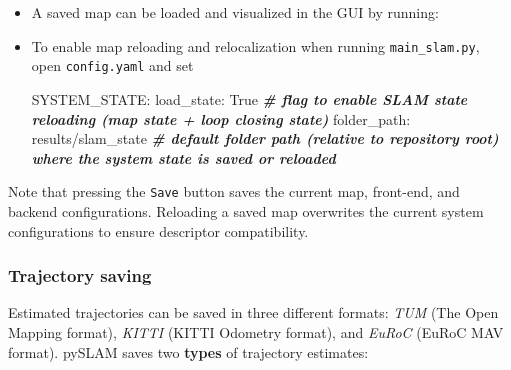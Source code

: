 \documentclass{article}
\newenvironment{Shaded}{\begin{snugshade}}{\end{snugshade}}
\newcommand{\BuiltInTok}[1]{\textcolor[rgb]{0.74,0.68,0.62}{#1}}
\newcommand{\CommentTok}[1]{\textcolor[rgb]{0.00,0.40,1.00}{\textbf{\textit{#1}}}}
\newcommand{\ExtensionTok}[1]{\textcolor[rgb]{0.74,0.68,0.62}{#1}}
\newcommand{\NormalTok}[1]{\textcolor[rgb]{0.74,0.68,0.62}{#1}}
\begin{document}
\begin{itemize}
\item
  A saved map can be loaded and visualized in the GUI by running: \\

\begin{scriptsize}
\begin{Shaded}
\end{Shaded}

\end{scriptsize}

\item
  To enable map reloading and relocalization when running
  \texttt{main\_slam.py}, open \texttt{config.yaml} and set \\

\begin{scriptsize}
\begin{Shaded}
\begin{Highlighting}[]
\ExtensionTok{SYSTEM_STATE}\NormalTok{:}
  \ExtensionTok{load_state}\NormalTok{: True                  }\CommentTok{# flag to enable SLAM state reloading (map state + loop closing state)}
  \ExtensionTok{folder_path}\NormalTok{: results/slam_state   }\CommentTok{# default folder path (relative to repository root) where the system state is saved or reloaded}
\end{Highlighting}
\end{Shaded}
\end{scriptsize}

\end{itemize}

Note that pressing the \texttt{Save} button saves the current map,
front-end, and backend configurations. Reloading a saved map overwrites
the current system configurations to ensure descriptor compatibility.

\hypertarget{trajectory-saving}{%
\subsubsection{Trajectory saving}\label{trajectory-saving}}

Estimated trajectories can be saved in three different formats:
\emph{TUM} (The Open Mapping format), \emph{KITTI} (KITTI Odometry
format), and \emph{EuRoC} (EuRoC MAV format). pySLAM saves two
\textbf{types} of trajectory estimates:
\end{document}
